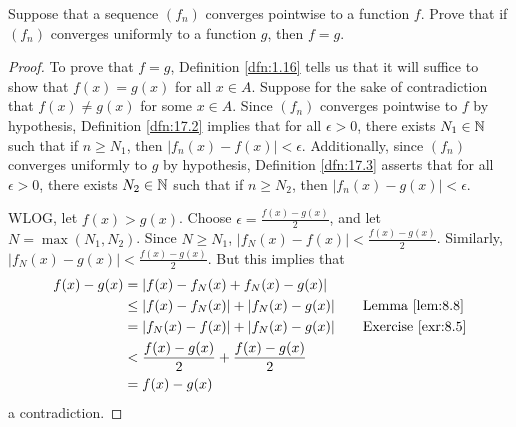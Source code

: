\documentclass[../main.tex]{subfiles}
\begin{document}
\begin{exercise}\label{exr:17.4}
    Suppose that a sequence $(f_n)$ converges pointwise to a function $f$. Prove that if $(f_n)$ converges uniformly to a function $g$, then $f=g$.
    \begin{proof}
        To prove that $f=g$, Definition \ref{dfn:1.16} tells us that it will suffice to show that $f(x)=g(x)$ for all $x\in A$. Suppose for the sake of contradiction that $f(x)\neq g(x)$ for some $x\in A$. Since $(f_n)$ converges pointwise to $f$ by hypothesis, Definition \ref{dfn:17.2} implies that for all $\epsilon>0$, there exists $N_1\in\mathbb{N}$ such that if $n\geq N_1$, then $|f_n(x)-f(x)|<\epsilon$. Additionally, since $(f_n)$ converges uniformly to $g$ by hypothesis, Definition \ref{dfn:17.3} asserts that for all $\epsilon>0$, there exists $N_2\in\mathbb{N}$ such that if $n\geq N_2$, then $|f_n(x)-g(x)|<\epsilon$.\par
        WLOG, let $f(x)>g(x)$. Choose $\epsilon=\frac{f(x)-g(x)}{2}$, and let $N=\max(N_1,N_2)$. Since $N\geq N_1$, $|f_N(x)-f(x)|<\frac{f(x)-g(x)}{2}$. Similarly, $|f_N(x)-g(x)|<\frac{f(x)-g(x)}{2}$. But this implies that
        \begin{align*}
            f(x)-g(x) &= |f(x)-f_N(x)+f_N(x)-g(x)|\\
            &\leq |f(x)-f_N(x)|+|f_N(x)-g(x)|\tag*{Lemma \ref{lem:8.8}}\\
            &= |f_N(x)-f(x)|+|f_N(x)-g(x)|\tag*{Exercise \ref{exr:8.5}}\\
            &< \frac{f(x)-g(x)}{2}+\frac{f(x)-g(x)}{2}\\
            &= f(x)-g(x)
        \end{align*}
        a contradiction.
    \end{proof}
\end{exercise}
\end{document}
